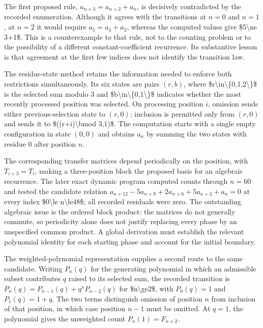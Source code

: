 \documentclass[11pt]{article}
\begin{document}
The first proposed rule, $a_{n+3}=a_{n+2}+a_n$, is decisively contradicted by the recorded enumeration. Although it agrees with the transitions at $n=0$ and $n=1$, at $n=2$ it would require $a_5=a_4+a_2$, whereas the computed values give \$5\textbackslash{}ne 3+1\$. This is a counterexample to that rule, not to the counting problem or to the possibility of a different constant-coefficient recurrence. Its substantive lesson is that agreement at the first few indices does not identify the transition law.

The residue-state method retains the information needed to enforce both restrictions simultaneously. Its six states are pairs $(r,b)$, where \$r\textbackslash{}in\textbackslash{}\{0,1,2\textbackslash{}\}\$ is the selected sum modulo $3$ and \$b\textbackslash{}in\textbackslash{}\{0,1\textbackslash{}\}\$ indicates whether the most recently processed position was selected. On processing position $i$, omission sends either previous-selection state to $(r,0)$; inclusion is permitted only from $(r,0)$ and sends it to \$((r+i)\textbackslash{}bmod 3,1)\$. The computation starts with a single empty configuration in state $(0,0)$ and obtains $a_n$ by summing the two states with residue $0$ after position $n$.

The corresponding transfer matrices depend periodically on the position, with $T_{i+3}=T_i$, making a three-position block the proposed basis for an algebraic recurrence. The later exact dynamic program computed counts through $n=60$ and tested the candidate relation $a_{n+12}-5a_{n+9}+2a_{n+6}+5a_{n+3}+a_n=0$ at every index \$0\textbackslash{}le n\textbackslash{}le48\$; all recorded residuals were zero. The outstanding algebraic issue is the ordered block product: the matrices do not generally commute, so periodicity alone does not justify replacing every phase by an unspecified common product. A global derivation must establish the relevant polynomial identity for each starting phase and account for the initial boundary.

The weighted-polynomial representation supplies a second route to the same candidate. Writing $P_n(q)$ for the generating polynomial in which an admissible subset contributes $q$ raised to its selected sum, the recorded transition is $P_n(q)=P_{n-1}(q)+q^nP_{n-2}(q)$ for \$n\textbackslash{}ge2\$, with $P_0(q)=1$ and $P_1(q)=1+q$. The two terms distinguish omission of position $n$ from inclusion of that position, in which case position $n-1$ must be omitted. At $q=1$, the polynomial gives the unweighted count $P_n(1)=F_{n+2}$.
\end{document}
